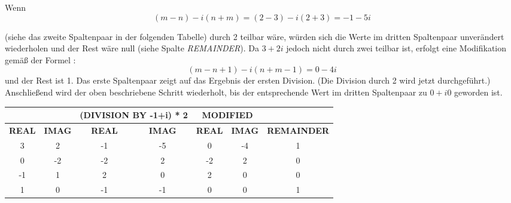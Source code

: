\documentclass[course=erap]{aspdoc}
\begin{document}
    Wenn
    \[(m - n) - i(n+m)=(2-3) - i(2 + 3) = -1 - 5i\]

    (siehe das zweite Spaltenpaar in der folgenden Tabelle) durch 2 teilbar wäre, würden sich die Werte im dritten Spaltenpaar unverändert wiederholen und der Rest wäre null (siehe Spalte \textit{REMAINDER}). Da $3 + 2 i$ jedoch nicht durch zwei teilbar ist, erfolgt eine Modifikation gemäß der Formel :
    \[(m - n + 1) - i(n + m - 1)= 0 - 4 i\]
    und der Rest ist 1. Das erste Spaltenpaar zeigt auf das Ergebnis der ersten Division. (Die Division durch 2 wird jetzt durchgeführt.) Anschließend wird der oben beschriebene Schritt wiederholt, bis der entsprechende Wert im dritten Spaltenpaar zu $0 + i0$ geworden ist.
    \\

    \begin{table}[!ht]
        \centering
        \begin{tabular}{|c|c|cc|cc|c|}
            \hline
            & & \multicolumn{2}{c|}{\textbf{(DIVISION BY -1+i) * 2}} & \multicolumn{2}{c|}{\textbf{MODIFIED}}             &                  \\ \hline
            \textbf{REAL} & \textbf{IMAG} & \multicolumn{1}{c|}{\textbf{REAL}} & \textbf{IMAG} & \multicolumn{1}{c|}{\textbf{REAL}} & \textbf{IMAG} & \textbf{REMAINDER} \\ \hline
            3             & 2             & \multicolumn{1}{c|}{-1}            & -5            & \multicolumn{1}{c|}{0}             & -4            & 1                  \\ \hline
            0             & -2            & \multicolumn{1}{c|}{-2}            & 2             & \multicolumn{1}{c|}{-2}            & 2             & 0                  \\ \hline
            -1            & 1             & \multicolumn{1}{c|}{2}             & 0             & \multicolumn{1}{c|}{2}             & 0             & 0                  \\ \hline
            1             & 0             & \multicolumn{1}{c|}{-1}            & -1            & \multicolumn{1}{c|}{0}             & 0             & 1                  \\ \hline
        \end{tabular}
    \end{table}
\end{document}
